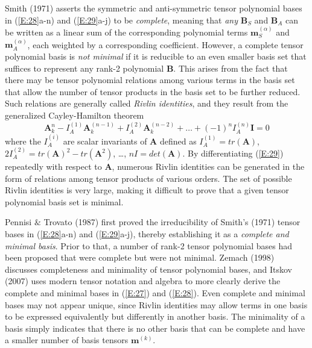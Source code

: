 Smith (1971) asserts the symmetric and anti-symmetric tensor polynomial bases in (\ref{E:28}a-n) and (\ref{E:29}a-j) to be \textit{complete}, meaning that \textit{any} $\mathbf{B}_S$  and $\mathbf{B}_A$ can be written as a linear sum of the corresponding polynomial terms  $\mathbf{m}^{(\alpha)}_S$ and $\mathbf{m}^{(\alpha)}_A$, each weighted by a corresponding coefficient. However, a complete tensor polynomial basis is \textit{not minimal} if it is reducible to an even smaller basis set that suffices to represent any rank-2 polynomial $\mathbf{B}$. This arises from the fact that there may be tensor polynomial relations among various terms in the basis set that allow the number of tensor products in the basis set to be further reduced. Such relations are generally called \textit{Rivlin identities}, and they result from the generalized Cayley-Hamilton theorem 
%
\begin{equation}
\label{E:30}
	\mathbf{A}^n_k - I^{(1)}_A \mathbf{A}^{(n-1)}_k + I^{(2)}_A \mathbf{A}^{(n-2)}_k
	+ \ldots + (-1)^{n}I^{(n)}_A \mathbf{I} = 0
\end{equation}
%
%   
where the  $I^{(i)}_{A}$ are scalar invariants of $\mathbf{A}$ defined as  $I^{(1)}_{A} = tr(\mathbf{A})$, $2I^{(2)}_{A} = tr(\mathbf{A})^2- tr(\mathbf{A}^2)$, \ldots , $nI = det(\mathbf{A})$. By differentiating (\ref{E:29}) repeatedly with respect to $\mathbf{A}$, numerous Rivlin identities can be generated in the form of relations among tensor products of various orders. The set of possible Rivlin identities is very large, making it difficult to prove that a given tensor polynomial basis set is minimal. 

Pennisi $\&$ Trovato (1987) first proved the irreducibility of Smith’s (1971) tensor bases in (\ref{E:28}a-n) and (\ref{E:29}a-j), thereby establishing it as a \textit{complete and minimal basis}. Prior to that, a number of rank-2 tensor polynomial bases had been proposed that were complete but were not minimal. Zemach (1998) discusses completeness and minimality of tensor polynomial bases, and Itskov (2007) uses modern tensor notation and algebra to more clearly derive the complete and minimal bases in (\ref{E:27}) and (\ref{E:28}).  Even complete and minimal bases may not appear unique, since Rivlin identities may allow terms in one basis to be expressed equivalently but differently in another basis. The minimality of a basis simply indicates that there is no other basis that can be complete and have a smaller number of basis tensors $\mathbf{m}^{(k)}$. 

